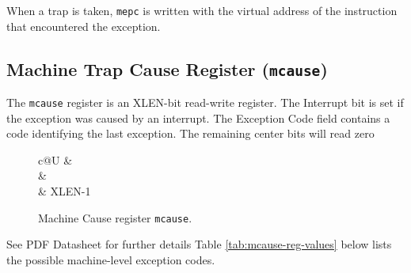 \fi

When a trap is taken, \texttt{mepc} is written with the virtual address of the
instruction that encountered the exception.

\subsection{Machine Trap Cause Register
(\texttt{mcause})}\label{machine-trap-cause-register-mcause}

The \texttt{mcause} register is an XLEN-bit read-write register. The Interrupt
bit is set if the exception was caused by an interrupt. The Exception
Code field contains a code identifying the last exception. The remaining
center bits will read zero

\ifdefined\MARKDOWN
\else
\begin{figure}[!ht]
	{\footnotesize
		\begin{center}
			\begin{tabular}{c@{}U}
				 &
				 \\
				\hline
				 &
				 \\
				 & XLEN-1 \\
			\end{tabular}
		\end{center}
	}
	\vspace{-0.1in}
	\caption{Machine Cause register \texttt{mcause}.}
	\label{fig:mcausereg}
\end{figure}
\fi

\ifdefined\MARKDOWN
See PDF Datasheet for further details
\else
Table \ref{tab:mcause-reg-values} below lists the possible machine-level exception codes.

